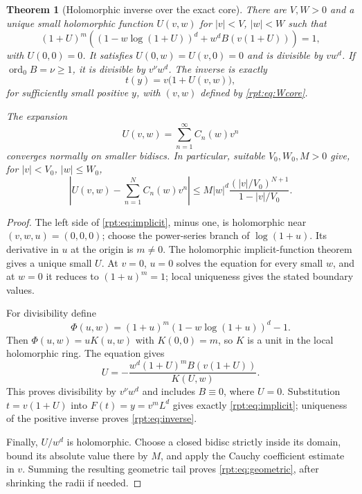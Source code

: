 \documentclass[11pt,a4paper]{article}
\numberwithin{equation}{section}
\newtheorem{theorem}{Theorem}[section]
\theoremstyle{definition}\newtheorem{definition}[theorem]{Definition}
\theoremstyle{remark}\newtheorem{remark}[theorem]{Remark}
\newcommand{\ord}{\operatorname{ord}}
\begin{document}
\begin{theorem}[Holomorphic inverse over the exact core]
\label{rpt:thm:inverse}
There are $V,W>0$ and a unique small holomorphic function $U(v,w)$ for $|v|<V$, $|w|<W$ such that
\begin{equation}
(1+U)^m\left((1-w\log(1+U))^d+w^dB(v(1+U))\right)=1,
\label{rpt:eq:implicit}
\end{equation}
with $U(0,0)=0$. It satisfies $U(0,w)=U(v,0)=0$ and is divisible by $vw^d$. If $\ord_0 B=\nu\ge1$, it is divisible by $v^\nu w^d$. The inverse is exactly
\begin{equation}
t(y)=v\bigl(1+U(v,w)\bigr),
\label{rpt:eq:inverse}
\end{equation}
for sufficiently small positive $y$, with $(v,w)$ defined by \eqref{rpt:eq:Wcore}.

The expansion
\begin{equation}
U(v,w)=\sum_{n=1}^{\infty}C_n(w)v^n
\label{rpt:eq:Useries}
\end{equation}
converges normally on smaller bidiscs. In particular, suitable $V_0,W_0,M>0$ give, for $|v|<V_0$, $|w|\le W_0$,
\begin{equation}
\left|U(v,w)-\sum_{n=1}^{N}C_n(w)v^n\right|
\le M|w|^d\frac{(|v|/V_0)^{N+1}}{1-|v|/V_0}.
\label{rpt:eq:geometric}
\end{equation}
\end{theorem}
\begin{proof}
The left side of \eqref{rpt:eq:implicit}, minus one, is holomorphic near $(v,w,u)=(0,0,0)$; choose the power-series branch of $\log(1+u)$. Its derivative in $u$ at the origin is $m\ne0$. The holomorphic implicit-function theorem gives a unique small $U$. At $v=0$, $u=0$ solves the equation for every small $w$, and at $w=0$ it reduces to $(1+u)^m=1$; local uniqueness gives the stated boundary values.

For divisibility define
\begin{equation}
\Phi(u,w)=(1+u)^m(1-w\log(1+u))^d-1.
\label{rpt:eq:Phi}
\end{equation}
Then $\Phi(u,w)=uK(u,w)$ with $K(0,0)=m$, so $K$ is a unit in the local holomorphic ring. The equation gives
\[
U=-\frac{w^d(1+U)^m B(v(1+U))}{K(U,w)}.
\]
This proves divisibility by $v^\nu w^d$ and includes $B\equiv0$, where $U=0$. Substitution $t=v(1+U)$ into $F(t)=y=v^mL^d$ gives exactly \eqref{rpt:eq:implicit}; uniqueness of the positive inverse proves \eqref{rpt:eq:inverse}.

Finally, $U/w^d$ is holomorphic. Choose a closed bidisc strictly inside its domain, bound its absolute value there by $M$, and apply the Cauchy coefficient estimate in $v$. Summing the resulting geometric tail proves \eqref{rpt:eq:geometric}, after shrinking the radii if needed.
\end{proof}
\end{document}

